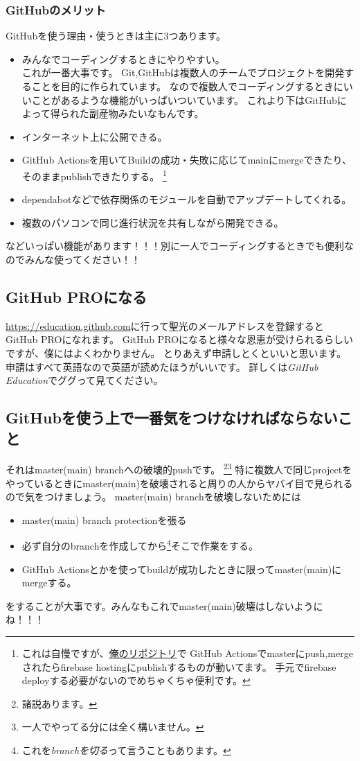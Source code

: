 \documentclass[dvipdfmx,jb5]{jarticle}
\begin{document}
\subsubsection{GitHubのメリット}
GitHubを使う理由・使うときは主に3つあります。
\begin{itemize}
  \item みんなでコーディングするときにやりやすい。\\
  これが一番大事です。
  Git,GitHubは複数人のチームでプロジェクトを開発することを目的に作られています。
  なので複数人でコーディングするときにいいことがあるような機能がいっぱいついています。
  これより下はGitHubによって得られた副産物みたいなもんです。
  \item インターネット上に公開できる。
  \item GitHub Actionsを用いてBuildの成功・失敗に応じてmainにmergeできたり、そのままpublishできたりする。
  \footnote{これは自慢ですが、\href{https://github.com/akimasa-l/hide4063}{俺のリポジトリ}で
  GitHub Actionsでmasterにpush,mergeされたらfirebase hostingにpublishするものが動いてます。
  手元でfirebase deployする必要がないのでめちゃくちゃ便利です。}
  \item dependabotなどで依存関係のモジュールを自動でアップデートしてくれる。
  \item 複数のパソコンで同じ進行状況を共有しながら開発できる。
\end{itemize}
などいっぱい機能があります！！！別に一人でコーディングするときでも便利なのでみんな使ってください！！
\subsection{GitHub PROになる}
\url{https://education.github.com}に行って聖光のメールアドレスを登録するとGitHub PROになれます。
GitHub PROになると様々な恩恵が受けられるらしいですが、僕にはよくわかりません。
とりあえず申請しとくといいと思います。
申請はすべて英語なので英語が読めたほうがいいです。
詳しくは\emph{GitHub Education}でググって見てください。
\subsection{GitHubを使う上で一番気をつけなければならないこと}
それはmaster(main) branchへの破壊的pushです。
\footnote{諸説あります。}\footnote{一人でやってる分には全く構いません。}
特に複数人で同じprojectをやっているときにmaster(main)を破壊されると周りの人からヤバイ目で見られるので気をつけましょう。
master(main) branchを破壊しないためには
\begin{itemize}
  \item master(main) branch protectionを張る
  \item 必ず自分のbranchを作成してから\footnote{これを\emph{branchを切る}って言うこともあります。}そこで作業をする。
  \item GitHub Actionsとかを使ってbuildが成功したときに限ってmaster(main)にmergeする。
\end{itemize}
をすることが大事です。みんなもこれでmaster(main)破壊はしないようにね！！！
\end{document}

